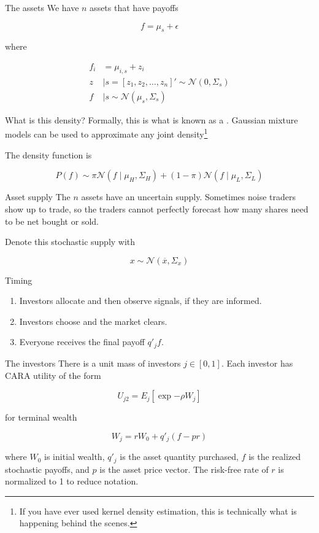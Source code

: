 \documentclass[
  ignorenonframetext,
]{beamer}
\providecommand{\tightlist}{%
  \setlength{\itemsep}{0pt}\setlength{\parskip}{0pt}}
\begin{document}
\begin{frame}{The assets}
\protect\hypertarget{the-assets}{}
We have \(n\) assets that have payoffs

\[
f = \mu_s + \epsilon
\]

where

\begin{align}
    f_i &= \mu_{i,s} + z_i\\
    z &\mid s = [z_1,z_2, \dots, z_n]' \sim \mathcal{N}(0, \Sigma_s) \\
    f &\mid s \sim \mathcal{N}(\mu_{s}, \Sigma_s)
\end{align}
\end{frame}

\begin{frame}{What is this density?}
\protect\hypertarget{what-is-this-density}{}
Formally, this is what is known as a .
Gaussian mixture models can be used to approximate any joint
density\footnote{If you have ever used kernel density estimation, this is technically what is happening behind the scenes.}

The density function is

\[
P(f) \sim \pi \mathcal{N}(f \mid \mu_H, \Sigma_H) + (1-\pi) \mathcal{N} (f \mid \mu_L, \Sigma_L)
\]
\end{frame}

\begin{frame}{Asset supply}
\protect\hypertarget{asset-supply}{}
The \(n\) assets have an uncertain supply. Sometimes noise traders show
up to trade, so the traders cannot perfectly forecast how many shares
need to be net bought or sold.

Denote this stochastic supply with

\[
x \sim \mathcal{N}(\overline x, \Sigma_x)
\]
\end{frame}

\begin{frame}{Timing}
\protect\hypertarget{timing}{}
\begin{enumerate}
\tightlist
\item
  Investors allocate  and then observe signals, if they
  are informed.
\item
  Investors choose  and the market clears.
\item
  Everyone receives the final payoff \(q'_j f\).
\end{enumerate}
\end{frame}

\begin{frame}{The investors}
\protect\hypertarget{the-investors}{}
There is a unit mass of investors \(j \in [0,1]\). Each investor has
CARA utility of the form

\[
U_{j2} = E_j[\exp{-\rho W_j}]
\]

for terminal wealth

\[
W_j = r W_0 + q'_j (f - pr)
\]

where \(W_0\) is initial wealth, \(q'_j\) is the asset quantity
purchased, \(f\) is the realized stochastic payoffs, and \(p\) is the
asset price vector. The risk-free rate of \(r\) is normalized to 1 to
reduce notation.
\end{frame}
\end{document}
